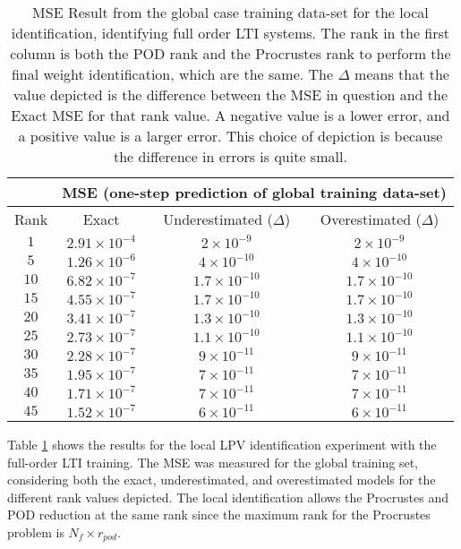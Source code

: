 \begin{table}[htb]
    \centering
        \caption{MSE Result from the global case training data-set for the local identification, identifying full order LTI systems. The rank in the first column is both the POD rank and the Procrustes rank to perform the final weight identification, which are the same. The $\Delta$ means that the value depicted is the difference between the MSE in question and the Exact MSE for that rank value. A negative value is a lower error, and a positive value is a larger error.
        This choice of depiction is because the difference in errors is quite small.}     \label{tab:local_result_linear1}
    \begin{tabular}{|c|c|c|c|}
       \cline{2-4}
     \multicolumn{1}{c}{}   & \multicolumn{3}{|c|}{MSE (one-step prediction of global training data-set)} \\\hline
      Rank & Exact & Underestimated ($\Delta$) & Overestimated ($\Delta$) \\\hline
      $1$ & $2.91\times 10^{-4} $& $2\times 10^{-9}$ & $2\times 10^{-9}$ \\ \hline
      $5$ & $1.26\times 10^{-6}$ & $4\times 10^{-10}$ & $4\times 10^{-10}$ \\ \hline 
      $10$ & $6.82\times 10^{-7}$ & $1.7\times 10^{-10} $ & $1.7\times 10^{-10}$ \\ \hline 
      $15$ & $4.55\times 10^{-7}$ & $1.7\times 10^{-10} $ & $1.7\times 10^{-10}$\\ \hline 
      $20$ & $3.41\times 10^{-7}$ &$1.3\times 10^{-10}$& $1.3\times 10^{-10}$\\ \hline
      $25$ & $2.73\times 10^{-7}$ &$1.1\times 10^{-10}$& $1.1\times 10^{-10}$ \\ \hline
      $30$ & $2.28\times 10^{-7}$ &$9\times 10^{-11}$ & $9\times 10^{-11}$\\ \hline
      $35$ & $1.95\times 10^{-7}$ &$7\times 10^{-11}$ & $7\times 10^{-11}$\\ \hline
      $40$ & $1.71\times 10^{-7}$ & $7\times 10^{-11}$ &$7\times 10^{-11}$\\ \hline
      $45$  & $1.52\times 10^{-7} $& $6\times 10^{-11}$& $6\times 10^{-11}$ \\ 
      \hline
    \end{tabular}
\end{table}


Table \ref{tab:local_result_linear1} shows the results for the local LPV identification experiment with the full-order LTI training.
%
The MSE was measured for the global training set, considering both the exact, underestimated, and overestimated models for the different rank values depicted.
%
The local identification allows the Procrustes and POD reduction at the same rank since the maximum rank for the Procrustes problem is $N_f \times r_{pod}$.


